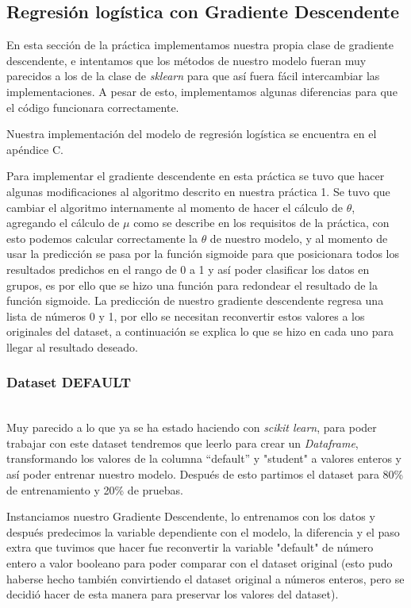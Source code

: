 \documentclass[sigconf,authorversion,nonacm]{acmart}
\begin{document}
\subsection{Regresión logística con Gradiente Descendente}
En esta sección de la práctica implementamos nuestra propia clase de gradiente descendente, e intentamos que los métodos de nuestro modelo fueran muy parecidos a los de la clase de \textit{sklearn} para que así fuera fácil intercambiar las implementaciones. A pesar de esto, implementamos algunas diferencias para que el código funcionara correctamente.

Nuestra implementación del modelo de regresión logística se encuentra en el apéndice C.

Para implementar el gradiente descendente en esta práctica se tuvo que hacer algunas modificaciones al algoritmo descrito en nuestra práctica 1. Se tuvo que cambiar el algoritmo internamente al momento de hacer el cálculo de $\theta$, agregando el cálculo de $\mu$ como se describe en los requisitos de la práctica, con esto podemos calcular correctamente la $\theta$ de nuestro modelo, y al momento de usar la predicción se pasa por la función sigmoide para que posicionara todos los resultados predichos en el rango de 0 a 1 y así poder clasificar los datos en grupos, es por ello que se hizo una función para redondear el resultado de la función sigmoide. La predicción de nuestro gradiente descendente regresa una lista de números 0 y 1, por ello se necesitan reconvertir estos valores a los originales del dataset, a continuación se explica lo que se hizo en cada uno para llegar al resultado deseado.

\subsubsection{Dataset DEFAULT}\hfill\\
Muy parecido a lo que ya se ha estado haciendo con \textit{scikit learn}, para poder trabajar con este dataset tendremos que leerlo para crear un \textit{Dataframe}, transformando los valores de la columna “default” y "student" a valores enteros y así poder entrenar nuestro modelo. Después de esto partimos el dataset para 80\% de entrenamiento y 20\% de pruebas.

Instanciamos nuestro Gradiente Descendente, lo entrenamos con los datos y después predecimos la variable dependiente con el modelo, la diferencia y el paso extra que tuvimos que hacer fue reconvertir la variable "default" de número entero a valor booleano para poder comparar con el dataset original (esto pudo haberse hecho también convirtiendo el dataset original a números enteros, pero se decidió hacer de esta manera para preservar los valores del dataset).
\end{document}
